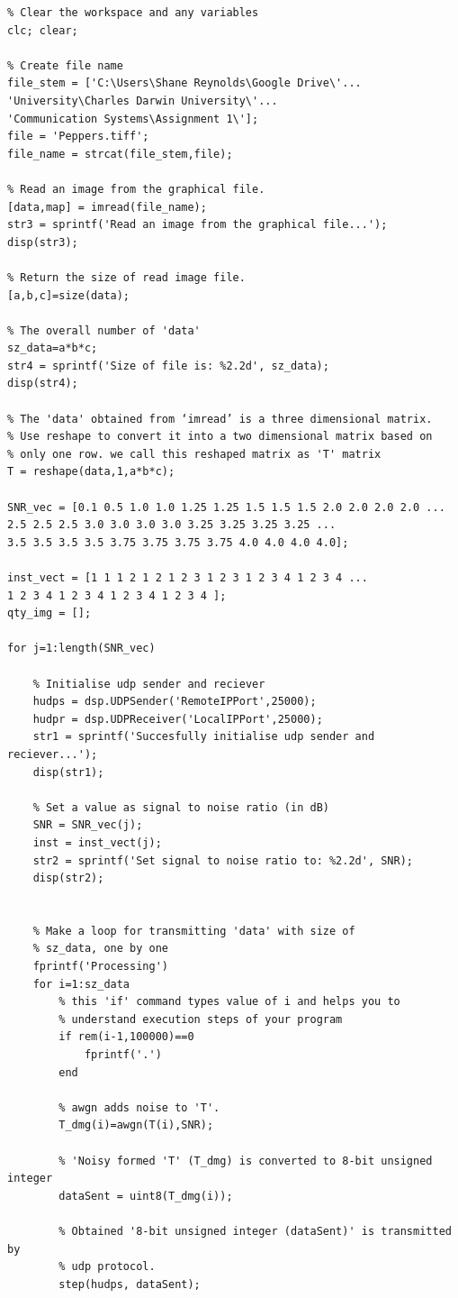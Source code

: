 \documentclass{article}
\begin{document}
\begin{lstlisting}
% Clear the workspace and any variables
clc; clear;

% Create file name
file_stem = ['C:\Users\Shane Reynolds\Google Drive\'...
'University\Charles Darwin University\'...
'Communication Systems\Assignment 1\'];
file = 'Peppers.tiff';
file_name = strcat(file_stem,file);

% Read an image from the graphical file.
[data,map] = imread(file_name);
str3 = sprintf('Read an image from the graphical file...');
disp(str3);

% Return the size of read image file.
[a,b,c]=size(data);

% The overall number of 'data'
sz_data=a*b*c;
str4 = sprintf('Size of file is: %2.2d', sz_data);
disp(str4);

% The 'data' obtained from ‘imread’ is a three dimensional matrix.
% Use reshape to convert it into a two dimensional matrix based on
% only one row. we call this reshaped matrix as 'T' matrix
T = reshape(data,1,a*b*c); 

SNR_vec = [0.1 0.5 1.0 1.0 1.25 1.25 1.5 1.5 1.5 2.0 2.0 2.0 2.0 ...
2.5 2.5 2.5 3.0 3.0 3.0 3.0 3.25 3.25 3.25 3.25 ...
3.5 3.5 3.5 3.5 3.75 3.75 3.75 3.75 4.0 4.0 4.0 4.0];

inst_vect = [1 1 1 2 1 2 1 2 3 1 2 3 1 2 3 4 1 2 3 4 ...
1 2 3 4 1 2 3 4 1 2 3 4 1 2 3 4 ];
qty_img = [];

for j=1:length(SNR_vec)

	% Initialise udp sender and reciever
	hudps = dsp.UDPSender('RemoteIPPort',25000); 
	hudpr = dsp.UDPReceiver('LocalIPPort',25000);
	str1 = sprintf('Succesfully initialise udp sender and reciever...');
	disp(str1);

	% Set a value as signal to noise ratio (in dB)
	SNR = SNR_vec(j);
	inst = inst_vect(j);
	str2 = sprintf('Set signal to noise ratio to: %2.2d', SNR);
	disp(str2);


	% Make a loop for transmitting 'data' with size of
	% sz_data, one by one
	fprintf('Processing')
	for i=1:sz_data
		% this 'if' command types value of i and helps you to
		% understand execution steps of your program
		if rem(i-1,100000)==0
			fprintf('.')
		end

		% awgn adds noise to 'T'.
		T_dmg(i)=awgn(T(i),SNR);

		% 'Noisy formed 'T' (T_dmg) is converted to 8-bit unsigned integer
		dataSent = uint8(T_dmg(i));

		% Obtained '8-bit unsigned integer (dataSent)' is transmitted by
		% udp protocol.
		step(hudps, dataSent);


\end{lstlisting}
\end{document}
